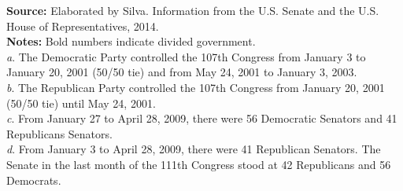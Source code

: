 \documentclass[12pt,a4paper]{article}
\begin{document}
\begin{table}[htbp]
	\begin{flushleft} 
	\scriptsize\textbf{Source:} {Elaborated by Silva. Information from the U.S. Senate and the U.S. House of Representatives, 2014.} \\
	\scriptsize\textbf{Notes:} Bold numbers indicate divided government.\\
	\emph{a}. The Democratic Party controlled the 107th Congress from January 3 to January 20, 2001 (50/50 tie) and from May 24, 2001 to January 3, 2003. \\
	\scriptsize\emph{b}. The Republican Party controlled the 107th Congress from January 20, 2001 (50/50 tie) until May 24, 2001.\\
	\scriptsize\emph{c}. From January 27 to April 28, 2009, there were 56 Democratic Senators and 41 Republicans Senators. \\
	\scriptsize\emph{d}. From January 3 to April 28, 2009, there were 41 Republican Senators. The Senate in the last month of the 111th Congress stood at 42 Republicans and 56 Democrats.\\
\end{flushleft}
	\end{table}

\end{document}
